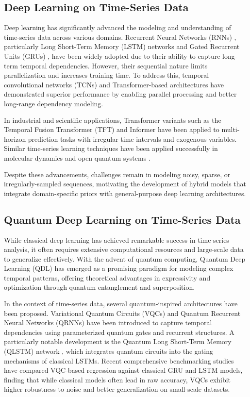 \documentclass[conference]{IEEEtran}
\begin{document}
\subsection{Deep Learning on Time-Series Data}
Deep learning has significantly advanced the modeling and understanding of time-series data across various domains. Recurrent Neural Networks (RNNs) \cite{schuster1997bidirectional}, particularly Long Short-Term Memory (LSTM) networks \cite{hochreiter1997long} and Gated Recurrent Units (GRUs) \cite{chung2014empirical}, have been widely adopted due to their ability to capture long-term temporal dependencies. However, their sequential nature limits parallelization and increases training time. To address this, temporal convolutional networks (TCNs) \cite{lea2017temporal} and Transformer-based architectures \cite{vaswani2017attention} have demonstrated superior performance by enabling parallel processing and better long-range dependency modeling. 


In industrial and scientific applications, Transformer variants such as the Temporal Fusion Transformer (TFT) \cite{lim2021temporal} and Informer \cite{zhou2021informer} have been applied to multi-horizon prediction tasks with irregular time intervals and exogenous variables. Similar time-series learning techniques have been applied successfully in molecular dynamics and open quantum systems \cite{tsai2022path, tsai2020learning}.

Despite these advancements, challenges remain in modeling noisy, sparse, or irregularly-sampled sequences, motivating the development of hybrid models that integrate domain-specific priors with general-purpose deep learning architectures.

\subsection{Quantum Deep Learning on Time-Series Data}
While classical deep learning has achieved remarkable success in time-series analysis, it often requires extensive computational resources and large-scale data to generalize effectively. With the advent of quantum computing, Quantum Deep Learning (QDL) \cite{biamonte2017quantum} has emerged as a promising paradigm for modeling complex temporal patterns, offering theoretical advantages in expressivity and optimization through quantum entanglement and superposition.

In the context of time-series data, several quantum-inspired architectures have been proposed. Variational Quantum Circuits (VQCs) \cite{gohel2024quantum} and Quantum Recurrent Neural Networks (QRNNs) \cite{takaki2021learning} have been introduced to capture temporal dependencies using parameterized quantum gates and recurrent structures. A particularly notable development is the Quantum Long Short-Term Memory (QLSTM) network \cite{chen2022quantum}, which integrates quantum circuits into the gating mechanisms of classical LSTMs. Recent comprehensive benchmarking studies \cite{fellner2025quantum_benchmark} have compared VQC-based regression against classical GRU and LSTM models, finding that while classical models often lead in raw accuracy, VQCs exhibit higher robustness to noise and better generalization on small-scale datasets.
\end{document}
